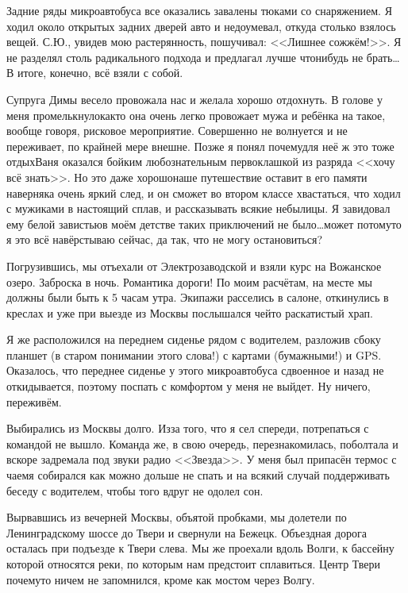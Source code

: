 Задние ряды микроавтобуса все оказались завалены тюками со снаряжением. Я ходил около открытых задних дверей авто и недоумевал, откуда столько взялось вещей. С.Ю., увидев мою растерянность, пошучивал:  <<Лишнее сожжём!>>. Я не разделял столь радикального подхода и предлагал лучше что\sdash нибудь не брать\ldots  В итоге, конечно, всё взяли с собой.

Супруга Димы весело провожала нас и желала хорошо отдохнуть. В голове у меня промелькнуло\mdash как\sdash то она очень легко провожает мужа и ребёнка на такое, вообще говоря, рисковое мероприятие. Совершенно не волнуется и не переживает, по крайней мере внешне. Позже я понял почему\mdash для неё ж это тоже отдых\mdash Ваня оказался бойким любознательным первоклашкой из разряда <<хочу всё знать>>. Но это даже хорошо\mdash наше путешествие оставит в его памяти наверняка очень яркий след, и он сможет во втором классе хвастаться, что ходил с мужиками в настоящий сплав, и рассказывать всякие небылицы. Я завидовал ему белой завистью\mdash в моём детстве таких приключений не было\ldots  может потому\sdash то я это всё навёрстываю сейчас, да так, что не могу остановиться?

Погрузившись, мы отъехали от Электрозаводской и взяли курс на Вожанское озеро. Заброска в ночь. Романтика дороги! По моим расчётам, на месте мы должны были быть к 5 часам утра. Экипажи расселись в салоне, откинулись в креслах и уже при выезде из Москвы послышался чей\sdash то раскатистый храп.

Я же расположился на переднем сиденье рядом с водителем, разложив сбоку планшет (в старом понимании этого слова!) с картами (бумажными!) и GPS. Оказалось, что переднее сиденье у этого микроавтобуса сдвоенное и назад не откидывается, поэтому поспать с комфортом у меня не выйдет. Ну ничего, переживём. 

Выбирались из Москвы долго. Из\sdash за того, что я сел спереди, потрепаться с командой не вышло. Команда же, в свою очередь, перезнакомилась, поболтала и вскоре задремала под звуки радио <<Звезда>>. У меня был припасён термос с чаем\mdash я собирался как можно дольше не спать и на всякий случай поддерживать беседу с водителем, чтобы того вдруг не одолел сон. 

Вырвавшись из вечерней Москвы, объятой пробками, мы долетели по Ленинградскому шоссе до Твери и свернули на Бежецк. Объездная дорога осталась при подъезде к Твери слева. Мы же проехали вдоль Волги, к бассейну которой относятся реки, по которым нам предстоит сплавиться. Центр Твери почему\sdash то ничем не запомнился, кроме как мостом через Волгу. 

